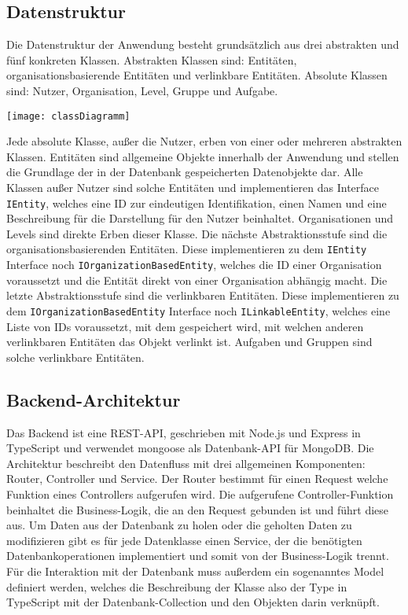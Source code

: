 \subsection{Datenstruktur}
Die Datenstruktur der Anwendung besteht grundsätzlich aus drei abstrakten und fünf konkreten Klassen. Abstrakten Klassen sind: Entitäten, organisationsbasierende Entitäten und verlinkbare Entitäten. Absolute Klassen sind: Nutzer, Organisation, Level, Gruppe und Aufgabe.

\vspace{20pt}
\begin{center}
    \begin{minipage}{1\linewidth}
        \texttt{[image: classDiagramm]}
    \end{minipage}
\end{center}
\vspace{20pt}

Jede absolute Klasse, außer die Nutzer, erben von einer oder mehreren abstrakten Klassen. Entitäten sind allgemeine Objekte innerhalb der Anwendung und stellen die Grundlage der in der Datenbank gespeicherten Datenobjekte dar. Alle Klassen außer Nutzer sind solche Entitäten und implementieren das Interface \verb|IEntity|, welches eine ID zur eindeutigen Identifikation, einen Namen und eine Beschreibung für die Darstellung für den Nutzer beinhaltet. Organisationen und Levels sind direkte Erben dieser Klasse. Die nächste Abstraktionsstufe sind die organisationsbasierenden Entitäten. Diese implementieren zu dem \verb|IEntity| Interface noch \verb|IOrganizationBasedEntity|, welches die ID einer Organisation voraussetzt und die Entität direkt von einer Organisation abhängig macht. Die letzte Abstraktionsstufe sind die verlinkbaren Entitäten. Diese implementieren zu dem \verb|IOrganizationBasedEntity| Interface noch \verb|ILinkableEntity|, welches eine Liste von IDs voraussetzt, mit dem gespeichert wird, mit welchen anderen verlinkbaren Entitäten das Objekt verlinkt ist. Aufgaben und Gruppen sind solche verlinkbare Entitäten.

\subsection{Backend-Architektur}
Das Backend ist eine REST-API, geschrieben mit Node.js und Express in TypeScript und verwendet mongoose als Datenbank-API für MongoDB. Die Architektur beschreibt den Datenfluss mit drei allgemeinen Komponenten: Router, Controller und Service.
Der Router bestimmt für einen Request welche Funktion eines Controllers aufgerufen wird. Die aufgerufene Controller-Funktion beinhaltet die Business-Logik, die an den Request gebunden ist und führt diese aus. Um Daten aus der Datenbank zu holen oder die geholten Daten zu modifizieren gibt es für jede Datenklasse einen Service, der die benötigten Datenbankoperationen implementiert und somit von der Business-Logik trennt. Für die Interaktion mit der Datenbank muss außerdem ein sogenanntes Model definiert werden, welches die Beschreibung der Klasse also der Type in TypeScript mit der Datenbank-Collection und den Objekten darin verknüpft.

